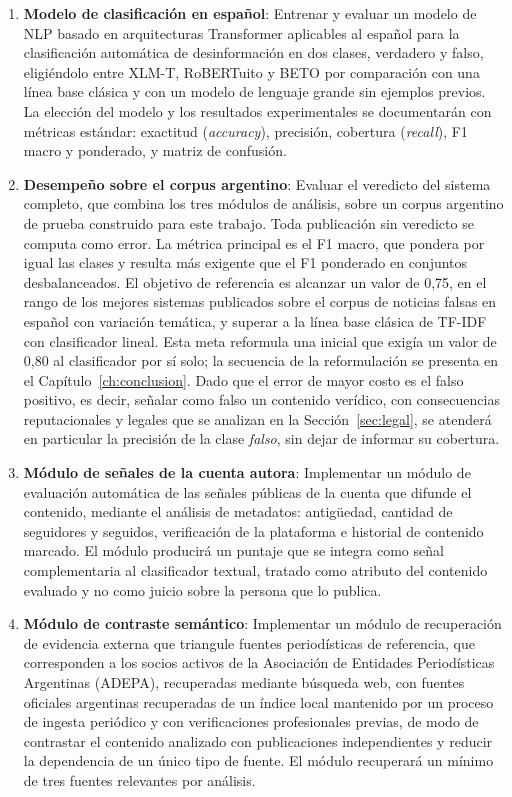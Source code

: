 \begin{enumerate}

    \item \textbf{Modelo de clasificación en español}: Entrenar y evaluar un modelo de NLP basado en arquitecturas Transformer aplicables al español para la clasificación automática de desinformación en dos clases, verdadero y falso, eligiéndolo entre XLM-T, RoBERTuito y BETO por comparación con una línea base clásica y con un modelo de lenguaje grande sin ejemplos previos. La elección del modelo y los resultados experimentales se documentarán con métricas estándar: exactitud (\textit{accuracy}), precisión, cobertura (\textit{recall}), F1 macro y ponderado, y matriz de confusión.

    \item \textbf{Desempeño sobre el corpus argentino}: Evaluar el veredicto del sistema completo, que combina los tres módulos de análisis, sobre un corpus argentino de prueba construido para este trabajo. Toda publicación sin veredicto se computa como error. La métrica principal es el F1 macro, que pondera por igual las clases y resulta más exigente que el F1 ponderado en conjuntos desbalanceados. El objetivo de referencia es alcanzar un valor de 0,75, en el rango de los mejores sistemas publicados sobre el corpus de noticias falsas en español con variación temática, y superar a la línea base clásica de TF-IDF con clasificador lineal. Esta meta reformula una inicial que exigía un valor de 0,80 al clasificador por sí solo; la secuencia de la reformulación se presenta en el Capítulo~\ref{ch:conclusion}. Dado que el error de mayor costo es el falso positivo, es decir, señalar como falso un contenido verídico, con consecuencias reputacionales y legales que se analizan en la Sección~\ref{sec:legal}, se atenderá en particular la precisión de la clase \textit{falso}, sin dejar de informar su cobertura.

    \item \textbf{Módulo de señales de la cuenta autora}: Implementar un módulo de evaluación automática de las señales públicas de la cuenta que difunde el contenido, mediante el análisis de metadatos: antigüedad, cantidad de seguidores y seguidos, verificación de la plataforma e historial de contenido marcado. El módulo producirá un puntaje que se integra como señal complementaria al clasificador textual, tratado como atributo del contenido evaluado y no como juicio sobre la persona que lo publica.

    \item \textbf{Módulo de contraste semántico}: Implementar un módulo de recuperación de evidencia externa que triangule fuentes periodísticas de referencia, que corresponden a los socios activos de la Asociación de Entidades Periodísticas Argentinas (ADEPA), recuperadas mediante búsqueda web, con fuentes oficiales argentinas recuperadas de un índice local mantenido por un proceso de ingesta periódico y con verificaciones profesionales previas, de modo de contrastar el contenido analizado con publicaciones independientes y reducir la dependencia de un único tipo de fuente. El módulo recuperará un mínimo de tres fuentes relevantes por análisis.


\end{enumerate}
